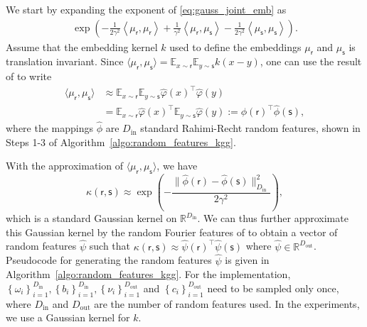 \documentclass[english]{article}
\theoremstyle{plain}
\theoremstyle{plain}
\begin{document}
We start by expanding the  exponent 
of \eqref{eq:gauss_joint_emb} as
%
\begin{align*}
  \exp\left(-\frac{1}{2\gamma^{2}}\left\langle \mu_{\mathsf{r}},\mu_{\mathsf{r}}\right\rangle +\frac{1}{\gamma^{2}}\left\langle \mu_{\mathsf{r}},\mu_{\mathsf{s}}\right\rangle -\frac{1}{2\gamma^{2}}\left\langle \mu_{\mathsf{s}},\mu_{\mathsf{s}}\right\rangle \right).
\end{align*}
%
Assume that the embedding kernel $k$ used to define the embeddings $\mu_\mathsf{r}$ 
and $\mu_\mathsf{s}$ is translation invariant. Since 
$\langle \mu_{\mathsf{r}},\mu_{\mathsf{s}}  \rangle
= \mathbb{E}_{x \sim \mathsf{r}} \mathbb{E}_{y \sim \mathsf{s}} k(x-y)$, one can use 
the result of \cite{Rahimi2007} to write
%
\begin{align*}
 \langle \mu_{\mathsf{r}},\mu_{\mathsf{s}}  \rangle
 & \approx \mathbb{E}_{x \sim \mathsf{r}} \mathbb{E}_{y \sim \mathsf{s}} 
   \hat{\varphi}(x)^\top \hat{\varphi}(y) \nonumber \\ 
 & = \mathbb{E}_{x \sim \mathsf{r}} 
   \hat{\varphi}(x)^\top \mathbb{E}_{y \sim \mathsf{s}}  \hat{\varphi}(y) 
 := \hat{\phi}(\mathsf{r})^\top \hat{\phi}(\mathsf{s}),
\end{align*}
%
where the mappings $\hat{\phi}$ are $D_\mathrm{in}$ standard Rahimi-Recht
random features, shown in Steps 1-3 of
Algorithm~\ref{algo:random_features_kgg}.



With the approximation of $\langle \mu_{\mathsf{r}},\mu_{\mathsf{s}}  \rangle$,
we have
\begin{equation}
\kappa(\mathsf{r}, \mathsf{s})\approx\exp\left(-\frac{\|\hat{\phi}(\mathsf{r})-\hat{\phi}(\mathsf{s})\|_{D_\mathrm{in}}^{2}}{2\gamma^{2}}\right),
%
\end{equation}
which is a standard Gaussian kernel on $\mathbb{R}^{D_\mathrm{in}}$.
We can thus further approximate this Gaussian kernel 
%
%
by the random Fourier features of \citeauthor{Rahimi2007} to obtain a vector 
of random features $\hat{\psi}$ such that 
$\kappa(\mathsf{r}, \mathsf{s}) \approx \hat{\psi}(\mathsf{r})^\top \hat{\psi}(\mathsf{s})$
where $\hat{\psi} \in \mathbb{R}^{D_\mathrm{out}}$. 
Pseudocode for generating the random features $\hat{\psi}$ is given in Algorithm~\ref{algo:random_features_kgg}. 
For the implementation, $\left\{ \omega_{i}\right\}
_{i=1}^{D_\mathrm{in}},\left\{ b_{i}\right\} _{i=1}^{D_\mathrm{in}},\left\{
    \nu_{i}\right\} _{i=1}^{D_\mathrm{out}}$ 
and $\left\{ c_{i}\right\} _{i=1}^{D_\mathrm{out}}$ need to be sampled only
once, where $D_\mathrm{in}$ and
$D_\mathrm{out}$ are the number of random features used. 
In the experiments, we use a Gaussian kernel for $k$.
\end{document}
